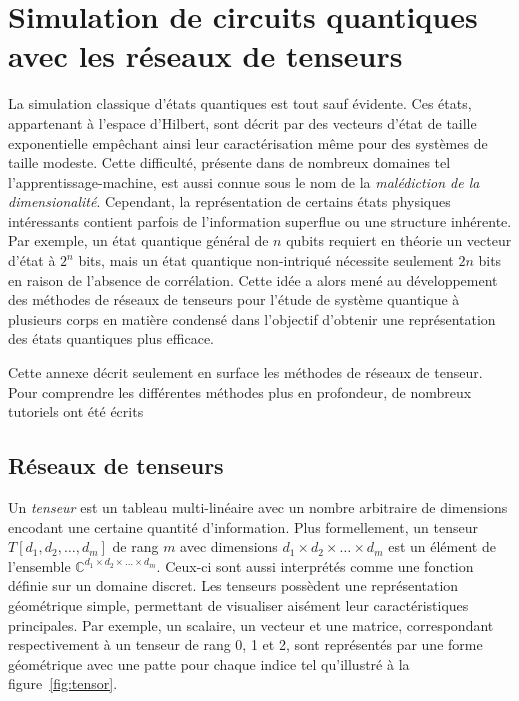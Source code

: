 \chapter{Simulation de circuits quantiques avec les réseaux de tenseurs}
\label{ann:simulation-circuits-quantiques-avec-reseaux-de-tenseurs}

La simulation classique d'états quantiques est tout sauf évidente. Ces états, appartenant à l'espace d'Hilbert, sont décrit par des vecteurs d'état de taille exponentielle empêchant ainsi leur caractérisation même pour des systèmes de taille modeste. Cette difficulté, présente dans de nombreux domaines tel l'apprentissage-machine, est aussi connue sous le nom de la \textit{malédiction de la dimensionalité}. Cependant, la représentation de certains états physiques intéressants contient parfois de l'information superflue ou une structure inhérente. Par exemple, un état quantique général de $n$ qubits requiert en théorie un vecteur d'état à $2^{n}$ bits, mais un état quantique non-intriqué nécessite seulement $2n$ bits en raison de l'absence de corrélation. Cette idée a alors mené au développement des méthodes de réseaux de tenseurs pour l'étude de système quantique à plusieurs corps en matière condensé dans l'objectif d'obtenir une représentation des états quantiques plus efficace. 

Cette annexe décrit seulement en surface les méthodes de réseaux de tenseur. Pour comprendre les différentes méthodes plus en profondeur, de nombreux tutoriels ont été écrits~\cite{bridgemanHandwavingInterpretiveDance2017a,biamonteTensorNetworksNutshell2017a,bakerMethodesCalculAvec2021a}


\section{Réseaux de tenseurs}


Un \textit{tenseur} est un tableau multi-linéaire avec un nombre arbitraire de dimensions encodant une certaine quantité d'information. Plus formellement, un tenseur $T[d_{1}, d_{2}, \dots, d_{m}]$ de rang $m$ avec dimensions $d_{1} \times d_{2} \times \dots \times d_{m}$ est un élément de l'ensemble $\mathbb{C}^{d_{1} \times d_{2} \times \dots \times d_{m}}$. Ceux-ci sont aussi interprétés comme une fonction définie sur un domaine discret. Les tenseurs possèdent une représentation géométrique simple, permettant de visualiser aisément leur caractéristiques principales. Par exemple, un scalaire, un vecteur et une matrice, correspondant respectivement à un tenseur de rang 0, 1 et 2, sont représentés par une forme géométrique avec une patte pour chaque indice tel qu'illustré à la figure~\ref{fig:tensor}.

